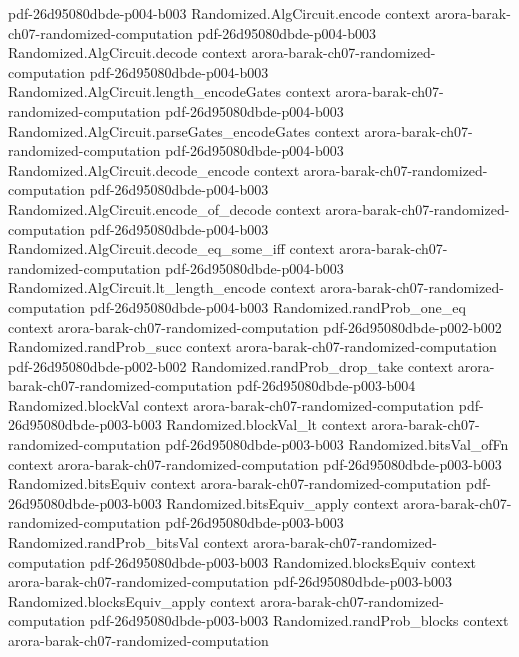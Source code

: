 \begin{theorem}
  {pdf-26d95080dbde-p004-b003}
\proofstep
  {Randomized.AlgCircuit.encode}
  {context}
  {arora-barak-ch07-randomized-computation}
  {pdf-26d95080dbde-p004-b003}
\proofstep
  {Randomized.AlgCircuit.decode}
  {context}
  {arora-barak-ch07-randomized-computation}
  {pdf-26d95080dbde-p004-b003}
\proofstep
  {Randomized.AlgCircuit.length_encodeGates}
  {context}
  {arora-barak-ch07-randomized-computation}
  {pdf-26d95080dbde-p004-b003}
\proofstep
  {Randomized.AlgCircuit.parseGates_encodeGates}
  {context}
  {arora-barak-ch07-randomized-computation}
  {pdf-26d95080dbde-p004-b003}
\proofstep
  {Randomized.AlgCircuit.decode_encode}
  {context}
  {arora-barak-ch07-randomized-computation}
  {pdf-26d95080dbde-p004-b003}
\proofstep
  {Randomized.AlgCircuit.encode_of_decode}
  {context}
  {arora-barak-ch07-randomized-computation}
  {pdf-26d95080dbde-p004-b003}
\proofstep
  {Randomized.AlgCircuit.decode_eq_some_iff}
  {context}
  {arora-barak-ch07-randomized-computation}
  {pdf-26d95080dbde-p004-b003}
\proofstep
  {Randomized.AlgCircuit.lt_length_encode}
  {context}
  {arora-barak-ch07-randomized-computation}
  {pdf-26d95080dbde-p004-b003}
\proofstep
  {Randomized.randProb_one_eq}
  {context}
  {arora-barak-ch07-randomized-computation}
  {pdf-26d95080dbde-p002-b002}
\proofstep
  {Randomized.randProb_succ}
  {context}
  {arora-barak-ch07-randomized-computation}
  {pdf-26d95080dbde-p002-b002}
\proofstep
  {Randomized.randProb_drop_take}
  {context}
  {arora-barak-ch07-randomized-computation}
  {pdf-26d95080dbde-p003-b004}
\proofstep
  {Randomized.blockVal}
  {context}
  {arora-barak-ch07-randomized-computation}
  {pdf-26d95080dbde-p003-b003}
\proofstep
  {Randomized.blockVal_lt}
  {context}
  {arora-barak-ch07-randomized-computation}
  {pdf-26d95080dbde-p003-b003}
\proofstep
  {Randomized.bitsVal_ofFn}
  {context}
  {arora-barak-ch07-randomized-computation}
  {pdf-26d95080dbde-p003-b003}
\proofstep
  {Randomized.bitsEquiv}
  {context}
  {arora-barak-ch07-randomized-computation}
  {pdf-26d95080dbde-p003-b003}
\proofstep
  {Randomized.bitsEquiv_apply}
  {context}
  {arora-barak-ch07-randomized-computation}
  {pdf-26d95080dbde-p003-b003}
\proofstep
  {Randomized.randProb_bitsVal}
  {context}
  {arora-barak-ch07-randomized-computation}
  {pdf-26d95080dbde-p003-b003}
\proofstep
  {Randomized.blocksEquiv}
  {context}
  {arora-barak-ch07-randomized-computation}
  {pdf-26d95080dbde-p003-b003}
\proofstep
  {Randomized.blocksEquiv_apply}
  {context}
  {arora-barak-ch07-randomized-computation}
  {pdf-26d95080dbde-p003-b003}
\proofstep
  {Randomized.randProb_blocks}
  {context}
  {arora-barak-ch07-randomized-computation}

\end{theorem}
